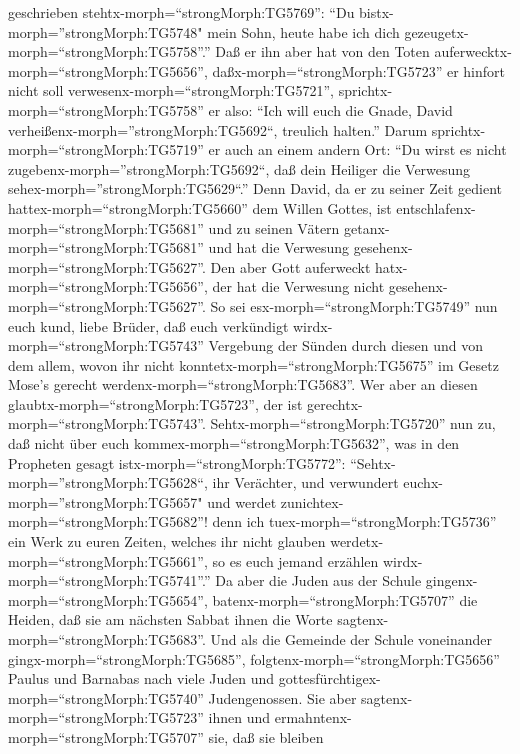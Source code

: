 geschrieben stehtx-morph=``strongMorph:TG5769'': ``Du
bistx-morph=''strongMorph:TG5748" mein Sohn, heute habe ich dich
gezeugetx-morph=``strongMorph:TG5758''.''  Daß er ihn aber
hat von den Toten auferwecktx-morph=``strongMorph:TG5656'',
daßx-morph=``strongMorph:TG5723'' er hinfort nicht soll
verwesenx-morph=``strongMorph:TG5721'',
sprichtx-morph=``strongMorph:TG5758'' er also: ``Ich will euch die
Gnade, David verheißenx-morph=''strongMorph:TG5692``, treulich halten.''
 Darum sprichtx-morph=``strongMorph:TG5719'' er auch an
einem andern Ort: ``Du wirst es nicht
zugebenx-morph=''strongMorph:TG5692``, daß dein Heiliger die Verwesung
sehex-morph=''strongMorph:TG5629``.''  Denn David, da er zu
seiner Zeit gedient hattex-morph=``strongMorph:TG5660'' dem Willen
Gottes, ist entschlafenx-morph=``strongMorph:TG5681'' und zu seinen
Vätern getanx-morph=``strongMorph:TG5681'' und hat die Verwesung
gesehenx-morph=``strongMorph:TG5627''.  Den aber Gott
auferweckt hatx-morph=``strongMorph:TG5656'', der hat die Verwesung
nicht gesehenx-morph=``strongMorph:TG5627''.  So sei
esx-morph=``strongMorph:TG5749'' nun euch kund, liebe Brüder, daß euch
verkündigt wirdx-morph=``strongMorph:TG5743'' Vergebung der Sünden durch
diesen und von dem allem, wovon ihr nicht
konntetx-morph=``strongMorph:TG5675'' im Gesetz Mose's gerecht
werdenx-morph=``strongMorph:TG5683''.  Wer aber an diesen
glaubtx-morph=``strongMorph:TG5723'', der ist
gerechtx-morph=``strongMorph:TG5743''. 
Sehtx-morph=``strongMorph:TG5720'' nun zu, daß nicht über euch
kommex-morph=``strongMorph:TG5632'', was in den Propheten gesagt
istx-morph=``strongMorph:TG5772'': 
``Sehtx-morph=''strongMorph:TG5628``, ihr Verächter, und verwundert
euchx-morph=''strongMorph:TG5657" und werdet
zunichtex-morph=``strongMorph:TG5682''! denn ich
tuex-morph=``strongMorph:TG5736'' ein Werk zu euren Zeiten, welches ihr
nicht glauben werdetx-morph=``strongMorph:TG5661'', so es euch jemand
erzählen wirdx-morph=``strongMorph:TG5741''.''  Da aber die
Juden aus der Schule gingenx-morph=``strongMorph:TG5654'',
batenx-morph=``strongMorph:TG5707'' die Heiden, daß sie am nächsten
Sabbat ihnen die Worte sagtenx-morph=``strongMorph:TG5683''.
 Und als die Gemeinde der Schule voneinander
gingx-morph=``strongMorph:TG5685'',
folgtenx-morph=``strongMorph:TG5656'' Paulus und Barnabas nach viele
Juden und gottesfürchtigex-morph=``strongMorph:TG5740'' Judengenossen.
Sie aber sagtenx-morph=``strongMorph:TG5723'' ihnen und
ermahntenx-morph=``strongMorph:TG5707'' sie, daß sie bleiben

